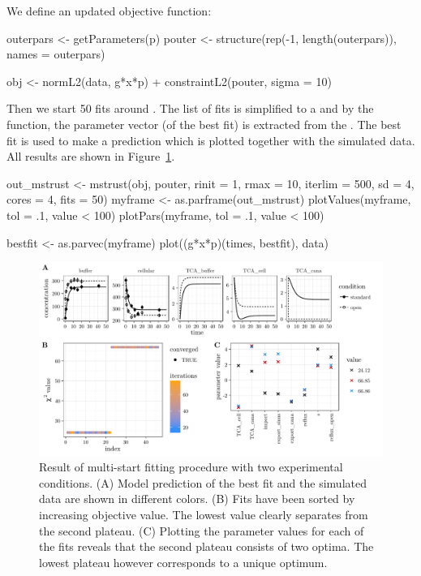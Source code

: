 \documentclass[article]{jss}
\begin{document}
We define an updated objective function:
\begin{CodeChunk}
\begin{CodeInput}
outerpars <- getParameters(p)
pouter <- structure(rep(-1, length(outerpars)), names = outerpars)

obj <- normL2(data, g*x*p) + constraintL2(pouter, sigma = 10)
\end{CodeInput}
\end{CodeChunk}

Then we start 50 fits around . The list of fits is simplified to a  and by the  function, the parameter vector (of the best fit) is extracted from the . The best fit is used to make a prediction which is plotted together with the simulated data. All results are shown in Figure~\ref{fig:twoconditions}.

\begin{CodeChunk}
\begin{CodeInput}
out_mstrust <- mstrust(obj, pouter, rinit = 1, rmax = 10, iterlim = 500,
		       sd = 4, cores = 4, fits = 50)
myframe <- as.parframe(out_mstrust)
plotValues(myframe, tol = .1, value < 100)
plotPars(myframe, tol = .1, value < 100)

bestfit <- as.parvec(myframe)
plot((g*x*p)(times, bestfit), data)
\end{CodeInput}
\end{CodeChunk}
\begin{figure}[ht]
	\centering
	\includegraphics[width = \textwidth]{images/figure6}
	\caption{Result of multi-start fitting procedure with two experimental conditions. (A) Model prediction of the best fit and the simulated data are shown in different colors. (B) Fits have been sorted by increasing objective value. The lowest value clearly separates from the second plateau. (C) Plotting the parameter values for each of the fits reveals that the second plateau consists of two optima. The lowest plateau however corresponds to a unique optimum.}
	\label{fig:twoconditions}
\end{figure}
\end{document}

